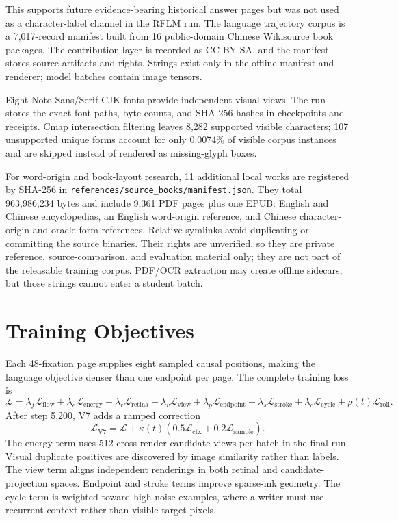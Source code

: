 \documentclass[11pt]{article}
\begin{document}
This supports future evidence-bearing historical answer pages but was not used as
a character-label channel in the RFLM run. The language trajectory corpus is a
7,017-record manifest built from 16 public-domain Chinese Wikisource book
packages. The contribution layer is recorded as CC BY-SA, and the manifest
stores source artifacts and rights. Strings exist only in the offline manifest
and renderer; model batches contain image tensors.

Eight Noto Sans/Serif CJK fonts provide independent visual views. The run stores
the exact font paths, byte counts, and SHA-256 hashes in checkpoints and
receipts. Cmap intersection filtering leaves 8,282 supported visible characters;
107 unsupported unique forms account for only 0.0074\% of visible corpus
instances and are skipped instead of rendered as missing-glyph boxes.

For word-origin and book-layout research, 11 additional local works are
registered by SHA-256 in \texttt{references/source\_books/manifest.json}. They
total 963,986,234 bytes and include 9,361 PDF pages plus one EPUB: English and
Chinese encyclopedias, an English word-origin reference, and Chinese character-
origin and oracle-form references. Relative symlinks avoid duplicating or
committing the source binaries. Their rights are unverified, so they are private
reference, source-comparison, and evaluation material only; they are not part
of the releasable training corpus. PDF/OCR extraction may create offline
sidecars, but those strings cannot enter a student batch.

\section{Training Objectives}

Each 48-fixation page supplies eight sampled causal positions, making the
language objective denser than one endpoint per page. The complete training loss
is
\[
\mathcal L =
\lambda_f\mathcal L_{\mathrm{flow}}+
\lambda_e\mathcal L_{\mathrm{energy}}+
\lambda_r\mathcal L_{\mathrm{retina}}+
\lambda_v\mathcal L_{\mathrm{view}}+
\lambda_p\mathcal L_{\mathrm{endpoint}}+
\lambda_s\mathcal L_{\mathrm{stroke}}+
\lambda_c\mathcal L_{\mathrm{cycle}}+
\rho(t)\mathcal L_{\mathrm{roll}}.
\]
After step 5,200, V7 adds a ramped correction
\[
\mathcal L_{\mathrm{V7}}=\mathcal L+
\kappa(t)\left(0.5\mathcal L_{\mathrm{ctx}}+
0.2\mathcal L_{\mathrm{sample}}\right).
\]
The energy term uses 512 cross-render candidate views per batch in the final
run. Visual duplicate positives are discovered by image similarity rather than
labels. The view term aligns independent renderings in both retinal and
candidate-projection spaces. Endpoint and stroke terms improve sparse-ink
geometry. The cycle term is weighted toward high-noise examples, where a writer
must use recurrent context rather than visible target pixels.
\end{document}
